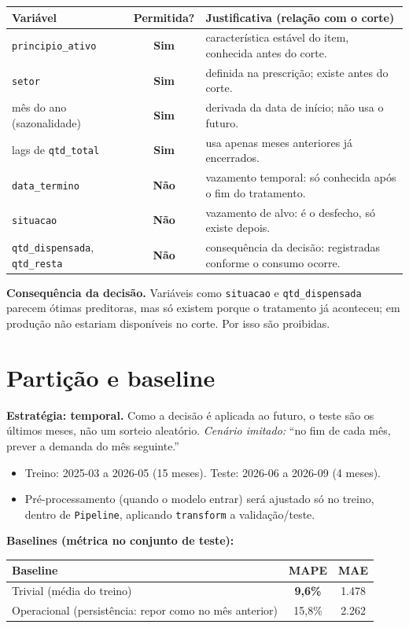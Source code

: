 \documentclass[11pt,a4paper]{article}
\newcommand{\sm}{\textbf{\textcolor{verdeF}{Sim}}}
\newcommand{\nao}{\textbf{\textcolor{vermelhoL}{Não}}}
\begin{document}
\begin{tabularx}{\textwidth}{@{}>{\raggedright\arraybackslash}p{3.9cm} c X@{}}
\toprule
\textbf{Variável} & \textbf{Permitida?} & \textbf{Justificativa (relação com o corte)} \\
\midrule
\texttt{principio\_ativo} & \sm & característica estável do item, conhecida antes do corte. \\
\texttt{setor} & \sm & definida na prescrição; existe antes do corte. \\
mês do ano (sazonalidade) & \sm & derivada da data de início; não usa o futuro. \\
lags de \texttt{qtd\_total} & \sm & usa apenas meses anteriores já encerrados. \\
\texttt{data\_termino} & \nao & vazamento temporal: só conhecida após o fim do tratamento. \\
\texttt{situacao} & \nao & vazamento de alvo: é o desfecho, só existe depois. \\
\texttt{qtd\_dispensada}, \texttt{qtd\_resta} & \nao & consequência da decisão: registradas conforme o consumo ocorre. \\
\bottomrule
\end{tabularx}

\textbf{Consequência da decisão.} Variáveis como \texttt{situacao} e \texttt{qtd\_dispensada} parecem ótimas preditoras, mas só existem porque o tratamento já aconteceu; em produção não estariam disponíveis no corte. Por isso são proibidas.

\section{Partição e baseline}
\textbf{Estratégia: temporal.} Como a decisão é aplicada ao futuro, o teste são os últimos meses, não um sorteio aleatório. \emph{Cenário imitado:} ``no fim de cada mês, prever a demanda do mês seguinte.''
\begin{itemize}
    \item Treino: 2025-03 a 2026-05 (15 meses). \quad Teste: 2026-06 a 2026-09 (4 meses).
    \item Pré-processamento (quando o modelo entrar) será ajustado só no treino, dentro de \texttt{Pipeline}, aplicando \texttt{transform} a validação/teste.
\end{itemize}

\textbf{Baselines (métrica no conjunto de teste):}

\begin{center}
\begin{tabular}{@{}lcc@{}}
\toprule
\textbf{Baseline} & \textbf{MAPE} & \textbf{MAE} \\
\midrule
Trivial (média do treino) & \textbf{9,6\%} & 1.478 \\
Operacional (persistência: repor como no mês anterior) & 15,8\% & 2.262 \\
\bottomrule
\end{tabular}
\end{center}
\end{document}
